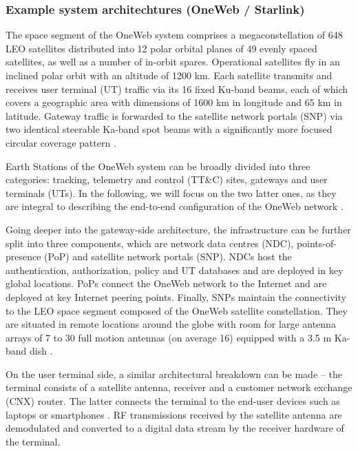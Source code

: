 \documentclass[english, 12pt, a4paper, elec, utf8, a-1b, online]{aaltothesis}
\begin{document}
\subsubsection{Example system architechtures (OneWeb / Starlink)}
The space segment of the OneWeb system comprises a megaconstellation of 648 LEO satellites distributed into 12 polar orbital planes of 49 evenly spaced satellites, as well as a number of in-orbit spares. 
Operational satellites fly in an inclined polar orbit with an altitude of 1200 km.
Each satellite transmits and receives user terminal (UT) traffic via its 16 fixed Ku-band beams, each of which covers a geographic area with dimensions of 1600 km in longitude and 65 km in latitude.
Gateway traffic is forwarded to the satellite network portals (SNP) via two identical steerable Ka-band spot beams with a significantly more focused circular coverage pattern \cite{henri2020oneweb, worldvu2016loi}.

Earth Stations of the OneWeb system can be broadly divided into three categories: tracking, telemetry and control (TT\&C) sites,  gateways and user terminals (UTs).
In the following, we will focus on the two latter ones, as they are integral to describing the end-to-end configuration of the OneWeb network \cite{worldvu2016loi}.

Going deeper into the gateway-side architecture, the infrastructure can be further split into three components, which are network data centres (NDC), points-of-presence (PoP) and satellite network portals (SNP).
NDCs host the authentication, authorization, policy and UT databases and are deployed in key global locations.
PoPs connect the OneWeb network to the Internet and are deployed at key Internet peering points.
Finally, SNPs maintain the connectivity to the LEO space segment composed of the OneWeb satellite constellation.
They are situated in remote locations around the globe with room for large antenna arrays of 7 to 30 full motion antennas (on average 16) equipped with a 3.5 m Ka-band dish \cite{henri2020oneweb}.

On the user terminal side, a similar architectural breakdown can be made – the terminal consists of a satellite antenna, receiver and a customer network exchange (CNX) router.
The latter connects the terminal to the end-user devices such as laptops or smartphones \cite{henri2020oneweb}. RF transmissions received by the satellite antenna are demodulated and converted to a digital data stream by the receiver hardware of the terminal.
\end{document}
